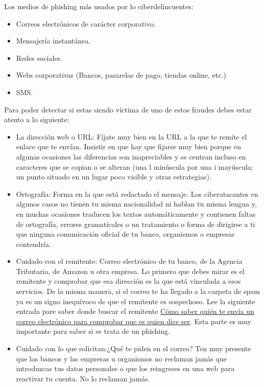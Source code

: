 \documentclass[
  a4paper,
  openany]{book}
\begin{document}
Los medios de phishing más usados por lo ciberdelincuentes:

\begin{itemize}
\item
  Correos electrónicos de carácter corporativo.
\item
  Mensajería instantánea.
\item
  Redes sociales.
\item
  Webs corporativas (Bancos, pasarelas de pago, tiendas online, etc.)
\item
  SMS.
\end{itemize}

Para poder detectar si estas siendo víctima de uno de estos fraudes debes estar atento a lo siguiente:

\begin{itemize}
\item
  La dirección web o URL: Fíjate muy bien en la URL a la que te remite el enlace que te envían. Insistir en que hay que fijarse muy bien porque en algunas ocasiones las diferencias son inapreciables y se centran incluso en caracteres que se copian o se alteran (una l minúscula por una i mayúscula; un punto situado en un lugar poco visible y otras estrategias).
\item
  Ortografía: Forma en la que está redactado el mensaje. Los ciberatacantes en algunos casos no tienen tu misma nacionalidad ni hablan tu misma lengua y, en muchas ocasiones traducen los textos automáticamente y contienen faltas de ortografía, errores gramaticales o un tratamiento o forma de dirigirse a ti que ninguna comunicación oficial de tu banco, organismos o empresas contendría.
\item
  Cuidado con el remitente: Correo electrónico de tu banco, de la Agencia Tributaria, de Amazon u otra empresa. Lo primero que debes mirar es el remitente y comprobar que esa dirección es la que está vinculada a esos servicios. De la misma manera, si el correo te ha llegado a la carpeta de spam ya es un signo inequívoco de que el remitente es sospechoso. Lee la siguiente entrada pare saber donde buscar el remitente \href{https://www.xataka.com/basics/como-saber-quien-te-envia-correo-electronico-para-comprobar-que-quien-dice-ser}{Cómo saber quién te envía un correo electrónico para comprobar que es quien dice ser}. Esta parte es muy importante para saber si se trata de un phishing.
\item
  Cuidado con lo que solicitan:¿Qué te piden en el correo? Ten muy presente que los bancos y las empresas u organismos no reclaman jamás que introduzcas tus datos personales o que los reingreses en una web para reactivar tu cuenta. No lo reclaman jamás.

\end{itemize}
\end{document}
